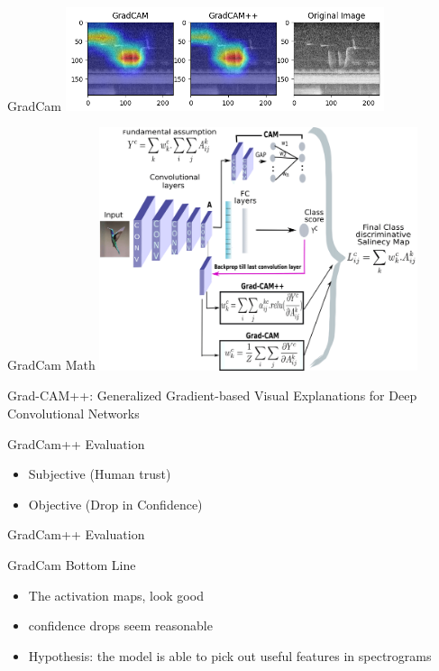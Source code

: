 \begin{frame}{GradCam}
    \centering
    \includegraphics[height=0.7\textheight,width=0.7\textwidth,keepaspectratio]{./images/screaming_gradcam_1.png}

\end{frame}
\begin{frame}{GradCam Math}
    \centering
    \includegraphics[height=0.7\textheight,width=0.7\textwidth,keepaspectratio]{./images/grad_cam_explination.png}

    Grad-CAM++: Generalized Gradient-based Visual Explanations for Deep Convolutional Networks
\end{frame}
\begin{frame}{GradCam++ Evaluation}
    \begin{itemize}
        \item Subjective (Human trust)
        \item Objective (Drop in Confidence)
    \end{itemize}
\end{frame}
\begin{frame}{GradCam++ Evaluation}

\end{frame}
\begin{frame}{GradCam Bottom Line}
    \begin{itemize}
        \item The activation maps, look good
        \item confidence drops seem reasonable
        \item Hypothesis: the model is able to pick out useful features in spectrograms
    \end{itemize}
\end{frame}


